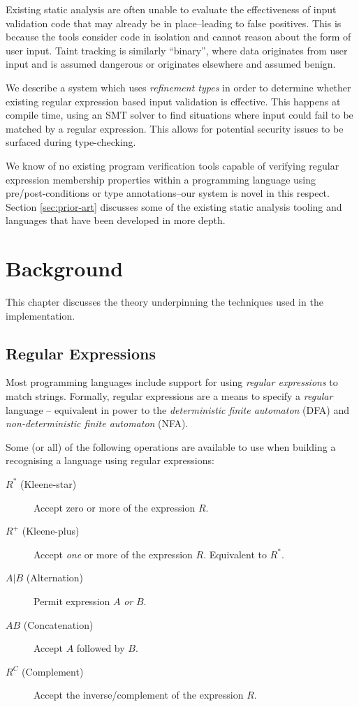 \documentclass[a4paper,openany,12pt]{book}
\begin{document}
Existing static analysis are often unable to evaluate the effectiveness of input validation code that may already be in
place--leading to false positives.
This is because the tools consider code in isolation and cannot reason about the form of user input.
Taint tracking is similarly ``binary'', where data originates from user input and is assumed dangerous or originates
elsewhere and assumed benign.

We describe a system which uses \emph{refinement types} in order to determine whether existing regular expression based
input validation is effective.
This happens at compile time, using an SMT solver to find situations where input could fail to be matched by a regular
expression.
This allows for potential security issues to be surfaced during type-checking.

We know of no existing program verification tools capable of verifying regular expression membership properties
within a programming language using pre/post-conditions or type annotations--our system is novel in this respect.
Section \ref{sec:prior-art} discusses some of the existing static analysis tooling and languages that have been
developed in more depth.

\chapter{Background}
This chapter discusses the theory underpinning the techniques used in the implementation.

\section{Regular Expressions}
\label{regexbg}

Most programming languages include support for using \emph{regular expressions} to match strings. Formally, regular
expressions are a means to specify a \emph{regular} language -- equivalent in power to the \emph{deterministic finite
automaton} (DFA) and \emph{non-deterministic finite automaton} (NFA).

Some (or all) of the following operations are available to use when building a recognising a language using regular
expressions:

\begin{description}
    \item[$R^*$ (Kleene-star)] Accept zero or more of the expression $R$.
    \item[$R^+$ (Kleene-plus)] Accept \emph{one} or more of the expression $R$. Equivalent to ${R^*}$.
    \item[$A \vert{} B$ (Alternation)] Permit expression $A$ \emph{or} $B$.
    \item[$AB$ (Concatenation)] Accept $A$ followed by $B$.
    \item[$R^C$ (Complement)] Accept the inverse/complement of the expression $R$.
\end{description}
\end{document}
